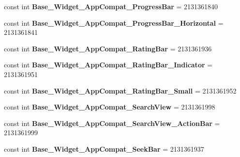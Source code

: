 \begin{DoxyCompactItemize}
const int {\bfseries Base\+\_\+\+Widget\+\_\+\+App\+Compat\+\_\+\+Progress\+Bar} = 2131361840
\item 
\mbox{\label{class_pinned_app_1_1_droid_1_1_resource_1_1_style_aade744d7e72e5494247626c6560ce98c}} 
const int {\bfseries Base\+\_\+\+Widget\+\_\+\+App\+Compat\+\_\+\+Progress\+Bar\+\_\+\+Horizontal} = 2131361841
\item 
\mbox{\label{class_pinned_app_1_1_droid_1_1_resource_1_1_style_a9cd8eee144e9f166bd3c4b5c1f6c529c}} 
const int {\bfseries Base\+\_\+\+Widget\+\_\+\+App\+Compat\+\_\+\+Rating\+Bar} = 2131361936
\item 
\mbox{\label{class_pinned_app_1_1_droid_1_1_resource_1_1_style_adccd3ae3d79662bcc87c5b8c0140c806}} 
const int {\bfseries Base\+\_\+\+Widget\+\_\+\+App\+Compat\+\_\+\+Rating\+Bar\+\_\+\+Indicator} = 2131361951
\item 
\mbox{\label{class_pinned_app_1_1_droid_1_1_resource_1_1_style_aa563de31dd072e237e7858371a4120c5}} 
const int {\bfseries Base\+\_\+\+Widget\+\_\+\+App\+Compat\+\_\+\+Rating\+Bar\+\_\+\+Small} = 2131361952
\item 
\mbox{\label{class_pinned_app_1_1_droid_1_1_resource_1_1_style_abdd83587a8d22b7d277c3ad8648c9a03}} 
const int {\bfseries Base\+\_\+\+Widget\+\_\+\+App\+Compat\+\_\+\+Search\+View} = 2131361998
\item 
\mbox{\label{class_pinned_app_1_1_droid_1_1_resource_1_1_style_afa24250312ba82dc28d4b4054bb98cd1}} 
const int {\bfseries Base\+\_\+\+Widget\+\_\+\+App\+Compat\+\_\+\+Search\+View\+\_\+\+Action\+Bar} = 2131361999
\item 
\mbox{\label{class_pinned_app_1_1_droid_1_1_resource_1_1_style_a8c63f38a2007618df175f21542c57958}} 
const int {\bfseries Base\+\_\+\+Widget\+\_\+\+App\+Compat\+\_\+\+Seek\+Bar} = 2131361937
\item 
\mbox{\label{class_pinned_app_1_1_droid_1_1_resource_1_1_style_a115f166d0007033a7265406924e8c743}} 

\end{DoxyCompactItemize}
